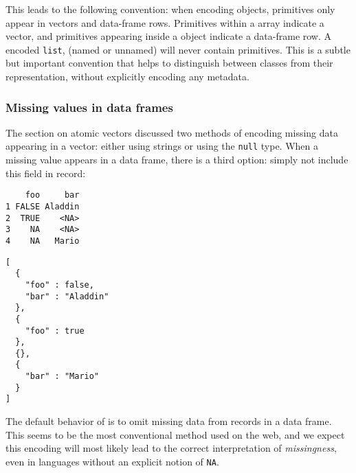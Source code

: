  This leads to the following convention: when encoding \R objects, \JSON primitives only appear in vectors and data-frame rows. Primitives within a \JSON array indicate a vector, and primitives appearing inside a \JSON object indicate a data-frame row. A \JSON encoded \texttt{list}, (named or unnamed) will never contain \JSON primitives. This is a subtle but important convention that helps to distinguish between \R classes from their \JSON representation, without explicitly encoding any metadata.

\subsubsection{Missing values in data frames}

The section on atomic vectors discussed two methods of encoding missing data appearing in a vector: either using strings or using the \JSON \texttt{null} type. When a missing value appears in a data frame, there is a third option: simply not include this field in \JSON record:

\begin{knitrout}\mycodesize
{}\color{fgcolor}\begin{kframe}
\begin{alltt}
 \hlkwb{<-} \hlstd{(} \hlstd{=} \hlstd{(}\hlstd{,} \hlstd{,} \hlstd{,} \hlstd{),}  \hlstd{=} \hlstd{(}\hlstd{,} \hlstd{,} \hlstd{,} \hlstd{))}
\end{alltt}
\begin{verbatim}
    foo     bar
1 FALSE Aladdin
2  TRUE    <NA>
3    NA    <NA>
4    NA   Mario
\end{verbatim}
\begin{alltt}
\hlstd{(}  \hlstd{=} \hlstd{))}
\end{alltt}
\begin{verbatim}
[
  {
    "foo" : false,
    "bar" : "Aladdin"
  },
  {
    "foo" : true
  },
  {},
  {
    "bar" : "Mario"
  }
]
\end{verbatim}
\end{kframe}
\end{knitrout}


 The default behavior of \jsonlite is to omit missing data from records in a data frame. This seems to be the most conventional method used on the web, and we expect this encoding will most likely lead to the correct interpretation of \emph{missingness}, even in languages without an explicit notion of \texttt{NA}.

